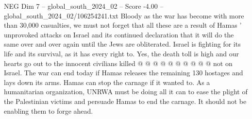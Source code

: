 \begin{textsample}{NEG Dim 7 – global\_south\_2024\_02 – Score -4.00 – global\_south\_2024\_02/106254241.txt}
Bloody as the war has become with more than 30,000 casualties, we must not forget that all these are a result of Hamas ' unprovoked attacks on Israel and its continued declaration that it will do the same over and over again until the Jews are obliterated.
Israel is fighting for its life and its survival, as it has every right to.
Yes, the death toll is high and our hearts go out to the innocent civilians killed @ @ @ @ @ @ @ @ @ @ not on Israel.
The war can end today if Hamas releases the remaining 130 hostages and lays down its arms.
Hamas can stop the carnage if it wanted to.
As a humanitarian organization, UNRWA must be doing all it can to ease the plight of the Palestinian victims and persuade Hamas to end the carnage.
It should not be enabling them to forge ahead.

\end{textsample}

